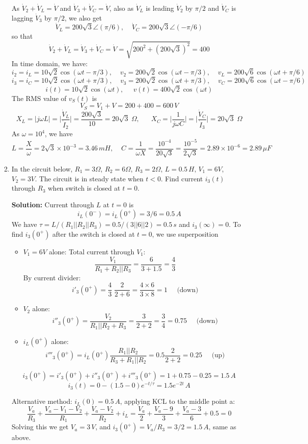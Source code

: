 \begin{enumerate}
  As $\dot{V}_2+\dot{V}_L=\dot{V}$ and $\dot{V}_3+\dot{V}_C=\dot{V}$,
  also as $\dot{V}_L$ is leading $\dot{V}_2$ by $\pi/2$ and
  $\dot{V}_C$ is lagging $\dot{V}_3$ by $\pi/2$, we also get
  \[
  \dot{V}_L=200\sqrt{3}\angle(\pi/6),\;\;\;\;
  \dot{V}_C=200\sqrt{3}\angle(-\pi/6)
  \]
  so that
  \[
  \dot{V}_2+\dot{V}_L=\dot{V}_3+\dot{V}_C=\dot{V}=\sqrt{200^2+(200\sqrt{3})^2}=400
  \]
  In time domain, we have:
  \[
  i_2=i_L=10\sqrt{2}\cos(\omega t-\pi/3),\;\;\;\;
  v_2=200\sqrt{2}\cos(\omega t-\pi/3),\;\;\;\;
  v_L=200\sqrt{6}\cos(\omega t+\pi/6)
  \]
  \[
  i_3=i_C=10\sqrt{2}\cos(\omega t+\pi/3),\;\;\;\; 
  v_3=200\sqrt{2}\cos(\omega t+\pi/3),\;\;\;\;
  v_C=200\sqrt{6}\cos(\omega t-\pi/6)
  \]
  \[
  i(t)=10\sqrt{2}\cos(\omega t),\;\;\;\;\;v(t)=400\sqrt{2}\cos(\omega t)
  \]
  The RMS value of $v_S(t)$ is 
  \[
  V_S=V_1+V=200+400=600\,V
  \]
  \]
  \[
  X_L=\big|j\omega L\big|=\bigg|\frac{\dot{V}_L}{\dot{I}_2}\bigg|=\frac{200\sqrt{3}}{10}=20\sqrt{3}\;\Omega,
  \;\;\;\;\;\;
  X_C=\bigg|\frac{1}{j\omega C}\bigg|=\bigg|\frac{\dot{V}_C}{\dot{I}_3}\bigg|=20\sqrt{3}\;\Omega
  \]
  As $\omega=10^4$, we have
  \[
  L=\frac{X}{\omega}=2\sqrt{3}\times 10^{-3}=3.46\,mH,\;\;\;\;
  C=\frac{1}{\omega X}=\frac{10^{-4}}{20\sqrt{3}}=\frac{10^{-5}}{2\sqrt{3}}
    =2.89\times 10^{-6}=2.89\,\mu F
  \]

\item  In the circuit below, $R_1=3\Omega$, $R_2=6\Omega$, $R_3=2\Omega$, 
  $L=0.5\,H$, $V_1=6V$, $V_2=3V$. The circuit is in steady state when 
  $t<0$. Find current $i_3(t)$ through $R_3$ when switch is closed at
  $t=0$.


  {\bf Solution:} Current through $L$ at $t=0$ is
  \[
  i_L(0^-)=i_L(0^+)=3/6=0.5\,A
  \]
  We have $\tau=L/(R_1||R_2||R_3)=0.5/(3||6||2)=0.5\,s$ and $i_3(\infty)=0$.
  To find $i_3(0^+)$ after the switch is closed at $t=0$, we use 
  superposition
  \begin{itemize}
  \item $V_1=6V$ alone: Total current through $V_1$:
    \[
    \frac{V_1}{R_1+R_2||R_3}=\frac{6}{3+1.5}=\frac{4}{3}
    \]
    By current divider:
    \[
    i'_3(0^+)=\frac{4}{3}\;\frac{2}{2+6}=\frac{4\times 6}{3\times 8}=1\;\;\;\;\;\mbox{(down)}
    \]
  \item $V_2$ alone: 
    \[
    i''_3(0^+)=\frac{V_2}{R_1||R_2+R_3}=\frac{3}{2+2}=\frac{3}{4}=0.75\;\;\;\;\;\mbox{(down)}
    \]
  \item $i_L(0^+)$ alone:
    \[
    i'''_3(0^+)=i_L(0^+)\frac{R_1||R_2}{R_3+R_1||R_2}=0.5\frac{2}{2+2}=0.25\;\;\;\;\;\mbox{(up)}
    \]
  \end{itemize}
  \[
  i_3(0^+)=i'_3(0^+)+i''_3(0^+)+i'''_3(0^+)=1+0.75-0.25=1.5\,A
  \]
  \[
  i_3(t)=0-(1.5-0)e^{-t/\tau}=1.5e^{-2t}\,A
  \]

  Alternative method: $i_L(0)=0.5\,A$, applying KCL to the middle point a:
  \[
  \frac{V_a}{R_3}+\frac{V_a-V_1-V_2}{R_1}+\frac{V_a-V_2}{R_2}+i_L
  =\frac{V_a}{2}+\frac{V_a-9}{3}+\frac{V_a-3}{6}+0.5=0
  \]
  Solving this we get $V_a=3\,V$, and $i_3(0^+)=V_a/R_3=3/2=1.5\,A$, same
  as above.

\end{enumerate}


